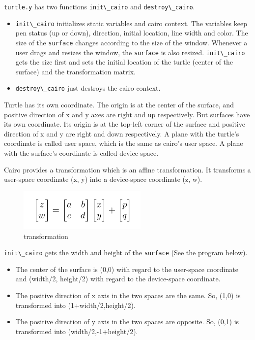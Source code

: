 \passthrough{\lstinline!turtle.y!} has two functions
\passthrough{\lstinline!init\_cairo!} and
\passthrough{\lstinline!destroy\_cairo!}.

\begin{itemize}
\tightlist
\item
  \passthrough{\lstinline!init\_cairo!} initializes static variables and
  cairo context. The variables keep pen status (up or down), direction,
  initial location, line width and color. The size of the
  \passthrough{\lstinline!surface!} changes according to the size of the
  window. Whenever a user drags and resizes the window, the
  \passthrough{\lstinline!surface!} is also resized.
  \passthrough{\lstinline!init\_cairo!} gets the size first and sets the
  initial location of the turtle (center of the surface) and the
  transformation matrix.
\item
  \passthrough{\lstinline!destroy\_cairo!} just destroys the cairo
  context.
\end{itemize}

Turtle has its own coordinate. The origin is at the center of the
surface, and positive direction of x and y axes are right and up
respectively. But surfaces have its own coordinate. Its origin is at the
top-left corner of the surface and positive direction of x and y are
right and down respectively. A plane with the turtle's coordinate is
called user space, which is the same as cairo's user space. A plane with
the surface's coordinate is called device space.

Cairo provides a transformation which is an affine transformation. It
transforms a user-space coordinate (x, y) into a device-space coordinate
(z, w).

\begin{figure}
\centering
\includegraphics[width=6.3cm,height=2.04cm]{../image/transformation.png}
\caption{transformation}
\end{figure}

\passthrough{\lstinline!init\_cairo!} gets the width and height of the
\passthrough{\lstinline!surface!} (See the program below).

\begin{itemize}
\tightlist
\item
  The center of the surface is (0,0) with regard to the user-space
  coordinate and (width/2, height/2) with regard to the device-space
  coordinate.
\item
  The positive direction of x axis in the two spaces are the same. So,
  (1,0) is transformed into (1+width/2,height/2).
\item
  The positive direction of y axis in the two spaces are opposite. So,
  (0,1) is transformed into (width/2,-1+height/2).
\end{itemize}

